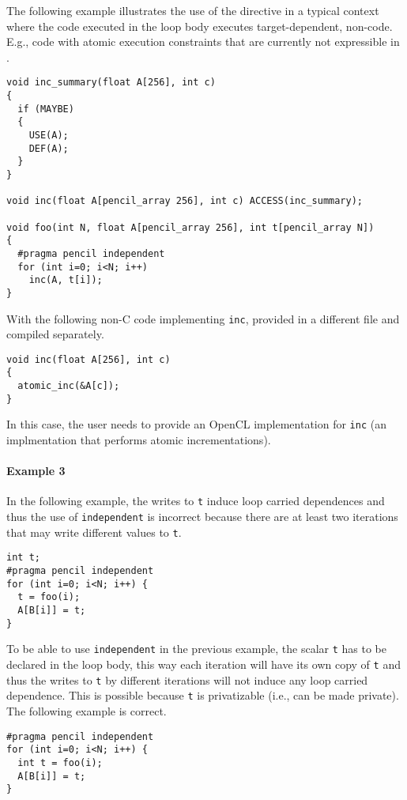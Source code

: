   The following example illustrates the use of the directive in a
  typical context where the code executed in the loop body executes
  target-dependent, non-\pencil code. E.g., code with atomic execution
  constraints that are currently not expressible in \pencil.
  \begin{lstlisting}[language=pencil]
void inc_summary(float A[256], int c)
{
  if (MAYBE)
  {
    USE(A);
    DEF(A);
  }
}

void inc(float A[pencil_array 256], int c) ACCESS(inc_summary);

void foo(int N, float A[pencil_array 256], int t[pencil_array N])
{
  #pragma pencil independent
  for (int i=0; i<N; i++)
    inc(A, t[i]);
}  
  \end{lstlisting}

  With the following non-\pencil C code implementing \lstinline!inc!,
  provided in a different file and compiled separately.
  \begin{lstlisting}[language=pencil]
void inc(float A[256], int c)
{
  atomic_inc(&A[c]);
}
  \end{lstlisting}

  In this case, the user needs to provide an OpenCL implementation for
  \lstinline!inc! (an implmentation that performs atomic incrementations).

\paragraph{Example 3}
  In the following example, the writes to \lstinline!t! induce loop carried
  dependences and thus the use of \lstinline!independent! is incorrect because
  there are at least two iterations that may write different values to
  \lstinline!t!.

  \begin{lstlisting}[language=pencil]
int t;
#pragma pencil independent
for (int i=0; i<N; i++) {
  t = foo(i);
  A[B[i]] = t;
}
  \end{lstlisting}  
  
  To be able to use \lstinline!independent! in the previous example, the
  scalar \lstinline!t! has to be declared in the loop body, this way each
  iteration will have its own copy of \lstinline!t! and thus the writes to
  \lstinline!t! by different iterations will not induce any loop carried
  dependence.  This is possible because \lstinline!t! is privatizable (i.e.,
  can be made private).
  The following example is correct.

  \begin{lstlisting}[language=pencil]
#pragma pencil independent
for (int i=0; i<N; i++) {
  int t = foo(i);
  A[B[i]] = t;
}
  \end{lstlisting}
   
